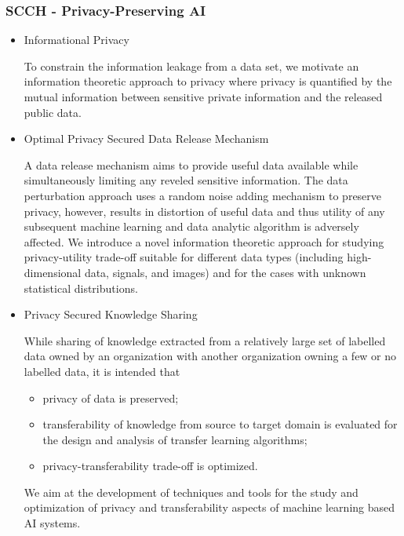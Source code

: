\documentclass[a4paper,11pt]{article}
\begin{document}
\subsubsection{SCCH - Privacy-Preserving AI}
\begin{itemize}
    \item Informational Privacy
    
    To constrain the information leakage from a data set, we motivate an information theoretic approach to  privacy where privacy is quantified by the mutual information between sensitive private information and the released public data.
    \item Optimal Privacy Secured Data Release Mechanism 
    
    A data release mechanism aims to provide useful data available while simultaneously limiting any reveled sensitive information. The data perturbation approach uses a random noise adding mechanism to preserve privacy, however, results in distortion of useful data and thus utility of any subsequent machine learning and data analytic algorithm is adversely affected. We introduce a novel information theoretic approach for studying privacy-utility trade-off suitable for different data types (including high-dimensional data, signals, and images) and for the cases with unknown statistical distributions. 
    
    \item Privacy Secured Knowledge Sharing
    
    While sharing of knowledge extracted from a relatively large set of labelled data owned by an organization with another organization owning a few or no labelled data, it is intended that 
    \begin{itemize}
        \item privacy of data is preserved;
        \item transferability of knowledge from source to target domain is evaluated for the design and analysis of transfer learning algorithms;
        \item privacy-transferability trade-off is optimized. 
    \end{itemize} 
    We aim at the development of techniques and tools for the study and optimization of privacy and transferability aspects of machine learning based AI systems. 
\end{itemize}
\end{document}
